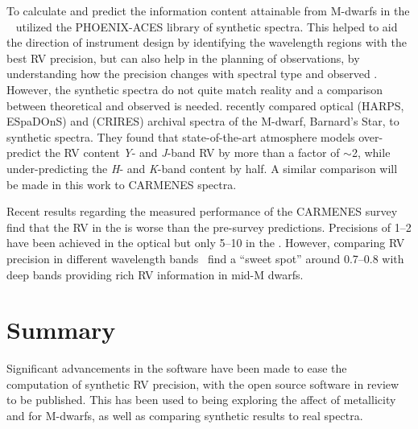 To calculate and predict the information content attainable from {M-dwarfs} in the \nir{}~\cite{figueira_radial_2016} utilized the {PHOENIX-ACES} library of synthetic spectra.
This helped to aid the direction of instrument design by identifying the wavelength regions with the best {RV} precision, but can also help in the planning of observations, by understanding how the precision changes with spectral type and observed {\snr{}}.
However, the synthetic spectra do not quite match reality and a comparison between theoretical and observed is needed.
\citet{artigau_optical_2018} recently compared optical ({HARPS}, {ESpaDOnS}) and \nir{} ({CRIRES}) archival spectra of the {M-dwarf}, Barnard's Star, to synthetic spectra.
They found that state-of-the-art atmosphere models over-predict the {RV} content \emph{Y}- and \emph{J}-band {RV} by more than a factor of \(\sim\)2, while under-predicting the \emph{H}- and \emph{K}-band content by half.
A similar comparison will be made in this work to {CARMENES} spectra.

Recent results regarding the measured performance of the {CARMENES} survey~\citep{reiners_carmenes_2018,quirrenbach_carmenes_2018} find that the {RV} in the \nir{} is worse than the pre-survey predictions.
Precisions of 1--2\mps{} have been achieved in the optical but only 5--10\mps{} in the \nir{}.
However, comparing RV precision in different wavelength bands~\citet{quirrenbach_carmenes_2018} find a ``sweet spot'' around 0.7--0.8\um{} with deep  bands providing rich {RV} information in mid-M dwarfs.

















\section{Summary}
Significant advancements in the \eniric{} software have been made to ease the computation of synthetic RV precision, with the open source software in review to be published.
This has been used to being exploring the affect of metallicity and \Logg{} for M-dwarfs, as well as comparing synthetic results to real spectra.
